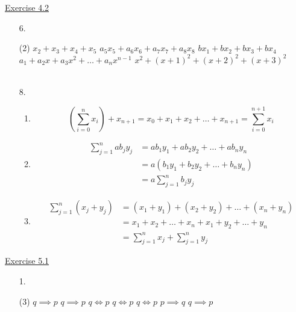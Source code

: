 \documentclass{./../../Latex/handout}
\begin{document}
\underline{Exercise 4.2}  
\begin{enumerate}
\item[6.]
\begin{tasks}(2)
\task  $x_{2}+x_{3}+x_{4}+x_{5}$
\task $a_{5} x_{5}+a_{6} x_{6}+a_{7} x_{7}+a_{8} x_{8}$
\task $b x_{1}+b x_{2}+b x_{3}+b x_{4}$
\task $a_{1}+a_{2} x+a_{3} x^{2}+\ldots+a_{n} x^{n-1}$
\task $x^{2}+(x+1)^{2}+(x+2)^{2}+(x+3)^{2}$  \\~\\
\end{tasks}

\item[8.] 
\begin{enumerate}
\item $$ \left(\sum_{i=0}^{n} x_{i} \right)+x_{n+1} =x_{0}+x_{1}+x_{2}+\ldots+x_{n+1}  =\sum_{i=0}^{n+1} x_{i} $$
\item $$ \begin{aligned} 
\sum_{j=1}^{n} a b_{j} y_{j}&=a b_{1} y_{1}+a b_{2} y_{2}+\ldots+a b_{n} y_{n} \\ 
&= a\left(b_{1} y_{1}+b_{2} y_{2}+\ldots+b_{n} y_{n}\right) \\
&= a \sum_{j=1}^{n} b_{j} y_{j} \end{aligned}$$
\item $$ \begin{aligned}  \sum_{j=1}^{n}\left(x_{j}+y_{j}\right) 
& =\left(x_{1}+y_{1}\right)+\left(x_{2}+y_{2}\right)+\ldots+\left(x_{n}+y_{n}\right) \\
& =x_{1}+x_{2}+\ldots+x_{n}+x_{1}+y_{2}+\ldots+y_{n} \\
& =\sum_{j=1}^{n} x_{j}+\sum_{j=1}^{n} y_{j} \end{aligned} $$
\end{enumerate}
\end{enumerate}

\underline{Exercise 5.1}  
\begin{enumerate}
\item[1.] \begin{tasks}(3)
\task $ q \implies p $
\task $ q \implies p $
\task $ q \iff p $
\task $ q \iff p $
\task $ q \iff p $
\task $ p \implies q $
\task $ q \implies p $ 
\end{tasks}
\end{enumerate}
\end{document}
